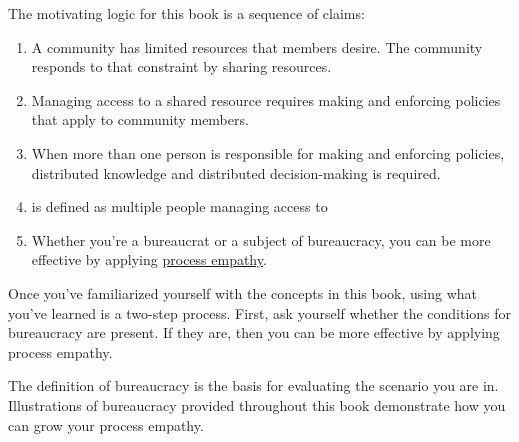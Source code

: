 The motivating logic for this book is a sequence of claims:
\begin{enumerate}
    \item A community has limited resources that members desire. The community responds to that constraint by sharing resources.
    \item Managing access to a \gls{shared resource} 
    \marginpar{[Glossary]}
    requires making and enforcing policies that apply to community members. 
    \item When more than one person is responsible for making and enforcing policies, distributed knowledge and distributed decision-making is required. 
    \item 
\iftoggle{glossarysubstitutionworks}{\Gls{bureaucracy}}{Bureaucracy}
\marginpar{[Glossary]}
    is defined as multiple people managing access to 
\iftoggle{glossarysubstitutionworks}{\glspl{shared resource}.}{shared resources.} 
    \item Whether you're a \gls{bureaucrat} 
    \marginpar{[Glossary]}
    or a subject of bureaucracy, you can be more effective by applying \hyperref[sec:process-empathy]{process empathy}.
\end{enumerate}

Once you've familiarized yourself with the concepts in this book, using what you've learned is a two-step process. First, ask yourself whether the conditions for bureaucracy are present. If they are, then you can be more effective by applying process empathy.

The definition of bureaucracy is the basis for evaluating the scenario you are in. Illustrations of bureaucracy provided throughout this book demonstrate how you can grow your process empathy. 